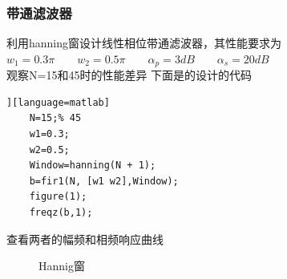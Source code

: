 \documentclass[UTF8]{ctexart}
\begin{document}
\subsubsection{带通滤波器}
利用hanning窗设计线性相位带通滤波器，其性能要求为$w_1=0.3\pi \qquad w_2=0.5\pi \qquad {\alpha}_p=3dB  \qquad {\alpha}_s=20dB  $\\
观察N=15和45时的性能差异
下面是的设计的代码
\begin{lstlisting}][language=matlab]
	N=15;% 45
	w1=0.3;
	w2=0.5;
	Window=hanning(N + 1);
	b=fir1(N, [w1 w2],Window);
	figure(1);
	freqz(b,1);
\end{lstlisting}
查看两者的幅频和相频响应曲线
\begin{figure}[H]
	\centering
	\quad
	\caption{Hannig窗}
\end{figure}
\end{document}
